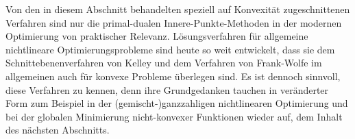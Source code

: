 \documentclass[12pt]{extreport} %
\theoremstyle{named}
\theoremstyle{nnamed}
\theoremstyle{itshape}
\theoremstyle{normal}
\begin{document}
Von den in diesem Abschnitt behandelten speziell auf Konvexität zugeschnittenen Verfahren sind nur die primal-dualen Innere-Punkte-Methoden in der modernen Optimierung von praktischer Relevanz. Lösungsverfahren für allgemeine nichtlineare Optimierungsprobleme sind heute so weit entwickelt, dass sie dem Schnittebenenverfahren von Kelley und dem Verfahren von Frank-Wolfe im allgemeinen auch für konvexe Probleme überlegen sind. Es ist dennoch sinnvoll, diese Verfahren zu kennen, denn ihre Grundgedanken tauchen in veränderter Form zum Beispiel in der (gemischt-)ganzzahligen nichtlinearen Optimierung und bei der globalen Minimierung nicht-konvexer Funktionen wieder auf, dem Inhalt des nächsten Abschnitts.

\end{document}
